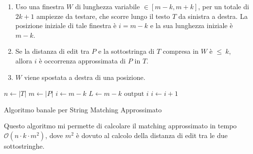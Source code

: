 \begin{enumerate}
    \item Uso una finestra $W$ di lunghezza variabile $\in [m - k, m + k]$, per un totale di $2k+1$ ampiezze da testare, che scorre lungo il testo $T$ da sinistra a destra. La posizione iniziale di tale finestra è $i = m - k$ e la sua lunghezza iniziale è $m - k$.
    \item Se la distanza di edit tra $P$ e la sottostringa di $T$ compresa in $W$ è $\leq \ k$, allora $i$ è occorrenza approssimata di $P$ in $T$.
    \item $W$ viene spostata a destra di una posizione.
\end{enumerate}
\begin{algorithm}
    \begin{algorithmic}
        \State $n\gets |T|$
        \State $m \gets |P|$
        \State $i\gets m - k$
        \State $L \gets  m - k$
        \State $\text{output } i$
        \EndIf
        \EndWhile
        \State $i \gets i + 1$
        \EndWhile
        \EndFunction
    \end{algorithmic}
    \caption{Algoritmo banale per String Matching Approssimato}
\end{algorithm}

Questo algoritmo mi permette di calcolare il matching approssimato in tempo
$\mathcal{O}(n \cdot k \cdot m^2)$, dove $m^2$ è dovuto al calcolo della distanza
di edit tra le due sottostringhe.
